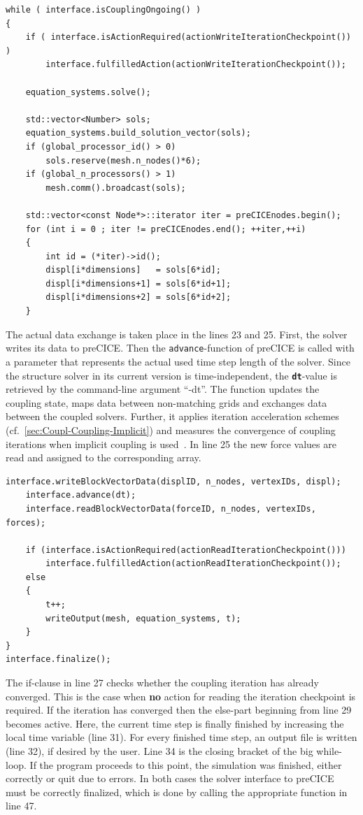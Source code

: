 \begin{lstlisting}[caption=preCICE main while-loop part 1,label=lst:preCICEint4a,keepspaces=true,name=while-loop]
while ( interface.isCouplingOngoing() )
{
	if ( interface.isActionRequired(actionWriteIterationCheckpoint()) )
		interface.fulfilledAction(actionWriteIterationCheckpoint());

	equation_systems.solve();

	std::vector<Number> sols;
	equation_systems.build_solution_vector(sols);
	if (global_processor_id() > 0)
		sols.reserve(mesh.n_nodes()*6);
	if (global_n_processors() > 1)
		mesh.comm().broadcast(sols);

	std::vector<const Node*>::iterator iter = preCICEnodes.begin();
	for (int i = 0 ; iter != preCICEnodes.end(); ++iter,++i)
	{
		int id = (*iter)->id();
		displ[i*dimensions]   = sols[6*id];
		displ[i*dimensions+1] = sols[6*id+1];
		displ[i*dimensions+2] = sols[6*id+2];
	}
\end{lstlisting}
   The actual data exchange is taken place in the lines 23 and 25. First, the solver writes its data to preCICE. Then the \texttt{advance}-function of preCICE is called with a parameter that represents the actual used time step length of the solver. Since the structure solver in its current version is time-independent, the \texttt{\textbf{dt}}-value is retrieved by the command-line argument ``-dt''. The function updates the coupling state, maps data between non-matching grids and exchanges data between the coupled solvers. Further, it applies iteration acceleration schemes (cf.~\ref{sec:Coupl-Coupling-Implicit}) and measures the convergence of coupling iterations when implicit coupling is used~\cite{gatzhammer2015efficient}. In line 25 the new force values are read and assigned to the corresponding array.

\begin{lstlisting}[caption=preCICE main while-loop part 2,label=lst:preCICEint4b,keepspaces=true,name=while-loop]
	interface.writeBlockVectorData(displID, n_nodes, vertexIDs, displ);
	interface.advance(dt);
	interface.readBlockVectorData(forceID, n_nodes, vertexIDs, forces);

	if (interface.isActionRequired(actionReadIterationCheckpoint()))
		interface.fulfilledAction(actionReadIterationCheckpoint());
	else
	{
		t++;
		writeOutput(mesh, equation_systems, t);
	}
}
interface.finalize();
\end{lstlisting}
   The if-clause in line 27 checks whether the coupling iteration has already converged. This is the case when \textbf{no} action for reading the iteration checkpoint is required. If the iteration has converged then the else-part beginning from line 29 becomes active. Here, the current time step is finally finished by increasing the local time variable (line 31). For every finished time step, an output file is written (line 32), if desired by the user. Line 34 is the closing bracket of the big while-loop. If the program proceeds to this point, the simulation was finished, either correctly or quit due to errors. In both cases the solver interface to preCICE must be correctly finalized, which is done by calling the appropriate function in line 47.
   
